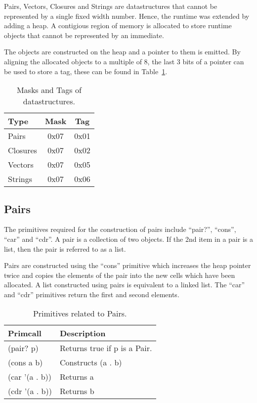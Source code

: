 \documentclass{article}
\begin{document}
Pairs, Vectors, Closures and Strings are datastructures that cannot be represented by a single fixed width number. Hence, the runtime was extended by adding a heap. A contigious region of memory is allocated to store runtime objects that cannot be represented by an immediate.

The objects are constructed on the heap and a pointer to them is emitted. By aligning the allocated objects to a multiple of 8, the last 3 bits of a pointer can be used to store a tag, these can be found in Table~\ref{tab:datastructures}.

\begin{table}[ht]
  \centering
\begin{tabular}{ l c c }
  \toprule
  Type & Mask & Tag  \\ \hline
  \midrule
  Pairs  & 0x07 & 0x01 \\
  Closures & 0x07 & 0x02 \\
  Vectors & 0x07 & 0x05 \\
  Strings & 0x07 & 0x06 \\
  \bottomrule
\end{tabular}
\caption{Masks and Tags of datastructures.} \label{tab:datastructures}
\end{table}

\subsection{Pairs}

The primitives required for the construction of pairs include ``pair?'', ``cons'', ``car'' and ``cdr''. A pair is a collection of two objects. If the 2nd item in a pair is a list, then the pair is referred to as a list.

Pairs are constructed using the ``cons'' primitive which increases the heap pointer twice and copies the elements of the pair into the new cells which have been allocated. A list constructed using pairs is equivalent to a linked list. The ``car'' and ``cdr'' primitives return the first and second elements.

\begin{table}[ht]
  \centering
\begin{tabular}{ l l }
  \toprule
  Primcall & Description \\ \hline
  \midrule
  (pair? p) & Returns true if p is a Pair.   \\
  (cons a b) & Constructs (a . b)  \\
  (car '(a . b)) & Returns a \\
  (cdr '(a . b)) & Returns b \\
  \bottomrule
\end{tabular}
\caption{Primitives related to Pairs.} \label{tab:pairs}
\end{table}
\end{document}
